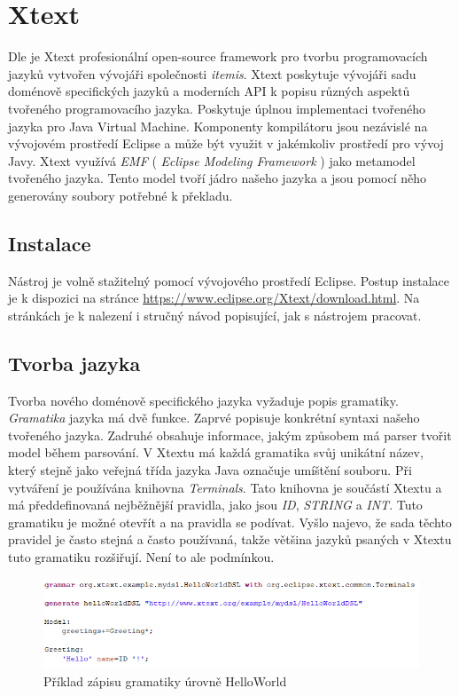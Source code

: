 \section{Xtext}

Dle \cite{Xtext} je Xtext profesionální open-source framework pro tvorbu programovacích jazyků vytvořen vývojáři společnosti \textit{itemis}. Xtext poskytuje  vývojáři sadu doménově specifických jazyků a moderních API k popisu různých aspektů tvořeného programovacího jazyka. Poskytuje úplnou implementaci tvořeného jazyka pro Java Virtual Machine. Komponenty kompilátoru jsou nezávislé na vývojovém prostředí Eclipse a může být využit v jakémkoliv prostředí pro vývoj Javy. Xtext využívá \textit{EMF} ( \textit{Eclipse Modeling Framework} ) jako metamodel tvořeného jazyka. Tento model tvoří jádro našeho jazyka a jsou pomocí něho generovány soubory potřebné k překladu. 

\subsection{Instalace}
Nástroj je volně stažitelný pomocí vývojového prostředí Eclipse. Postup instalace je k dispozici na stránce \url{https://www.eclipse.org/Xtext/download.html}. Na stránkách je k nalezení i stručný návod popisující, jak s nástrojem pracovat.

\subsection{Tvorba jazyka}

Tvorba nového doménově specifického jazyka vyžaduje popis gramatiky. \textit{Gramatika} jazyka má dvě funkce. Zaprvé popisuje konkrétní syntaxi našeho tvořeného jazyka. Zadruhé obsahuje informace, jakým způsobem má parser tvořit model během parsování. V Xtextu má každá gramatika svůj unikátní název, který stejně jako veřejná třída jazyka Java označuje umíštění souboru. Při vytváření je používána knihovna \textit{Terminals}. Tato knihovna je součástí Xtextu a má předdefinovaná nejběžnější pravidla, jako jsou \textit{ID}, \textit{STRING} a \textit{INT}. Tuto gramatiku je možné otevřít a na pravidla se podívat. Vyšlo najevo, že sada těchto pravidel je často stejná a často používaná, takže většina jazyků psaných v Xtextu tuto gramatiku rozšiřují. Není to ale podmínkou.

\begin{figure}[H]
	\centering
	\includegraphics[width=\linewidth]{images/xtext/hello_world_xtext}
	\caption{Příklad zápisu gramatiky úrovně HelloWorld}
\end{figure}

